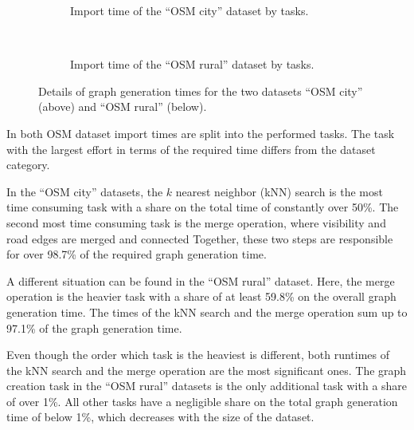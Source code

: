 			\begin{figure}[h!]
				\begin{figcenter}
					\begin{subfigure}[t]{\textwidth}
						\begin{figcenter}
							
						\end{figcenter}
						\caption{Import time of the \enquote{OSM city} dataset by tasks.}
					\end{subfigure}
					\\[3ex]
					\begin{subfigure}[t]{\textwidth}
						\begin{figcenter}
							
						\end{figcenter}
						\caption{Import time of the \enquote{OSM rural} dataset by tasks.}
					\end{subfigure}
				\end{figcenter}
				\caption{Details of graph generation times for the two datasets \enquote{OSM city} (above) and \enquote{OSM rural} (below).}
				\label{fig:eval-import-details}
			\end{figure}
			
			In  both OSM dataset import times are split into the performed tasks.
			The task with the largest effort in terms of the required time differs from the dataset category.
			
			In the \enquote{OSM city} datasets, the $k$ nearest neighbor (kNN) search is the most time consuming task with a share on the total time of constantly over 50\%.
			The second most time consuming task is the merge operation, where visibility and road edges are merged and connected
			Together, these two steps are responsible for over 98.7\% of the required graph generation time.
			
			A different situation can be found in the \enquote{OSM rural} dataset.
			Here, the merge operation is the heavier task with a share of at least 59.8\% on the overall graph generation time.
			The times of the kNN search and the merge operation sum up to 97.1\% of the graph generation time.
			
			
			Even though the order which task is the heaviest is different, both runtimes of the kNN search and the merge operation are the most significant ones.
			The graph creation task in the \enquote{OSM rural} datasets is the only additional task with a share of over 1\%.
			All other tasks have a negligible share on the total graph generation time of below 1\%, which decreases with the size of the dataset.
			
